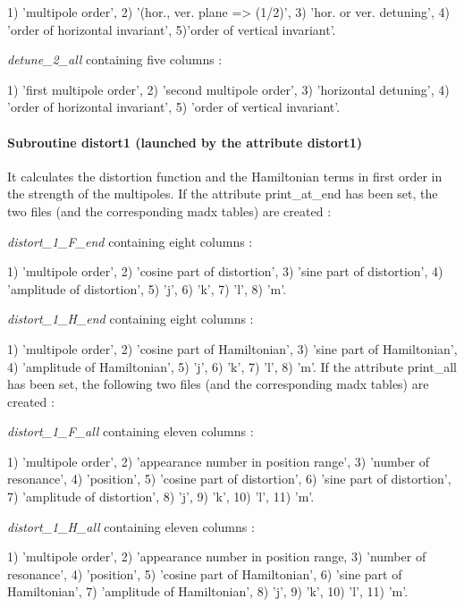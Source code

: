  1) 'multipole order', 2) '(hor., ver. plane => (1/2)',  3) 'hor. or ver. detuning', 4) 'order of horizontal invariant', 5)'order of vertical invariant'. 
 
\textit{detune\_2\_all}  containing five columns :  

 1) 'first multipole order', 2) 'second multipole order',  3) 'horizontal detuning', 4) 'order of horizontal invariant', 5) 'order of vertical invariant'. 




\paragraph{Subroutine distort1 (launched by the attribute distort1)}  It calculates the distortion function and the Hamiltonian terms in first order in the strength of the multipoles. If the attribute print\_at\_end has been set, the two files  (and the corresponding madx tables) are created : 

\textit{distort\_1\_F\_end} containing eight columns : 

 1) 'multipole order', 2) 'cosine part of distortion', 3) 'sine part of distortion', 4) 'amplitude of distortion', 5) 'j', 6) 'k', 7) 'l', 8) 'm'. 

\textit{distort\_1\_H\_end}  containing eight columns : 

 1) 'multipole order', 2) 'cosine part of Hamiltonian', 3) 'sine part of Hamiltonian', 4) 'amplitude of Hamiltonian', 5) 'j', 6) 'k', 7) 'l', 8) 'm'.  
 If the attribute print\_all has been set, the following two files  (and the corresponding madx tables) are created : 

\textit{distort\_1\_F\_all} containing eleven columns :  

 1) 'multipole order', 2) 'appearance number in position range', 3) 'number of resonance', 4) 'position', 5) 'cosine part of distortion', 6) 'sine part of distortion', 7) 'amplitude of distortion', 8) 'j', 9) 'k', 10) 'l', 11) 'm'. 

\textit{distort\_1\_H\_all}  containing eleven columns : 

 1) 'multipole order', 2) 'appearance number in position range, 3) 'number of resonance', 4) 'position', 5) 'cosine part of Hamiltonian', 6) 'sine part of Hamiltonian', 7) 'amplitude of Hamiltonian', 8) 'j', 9) 'k', 10) 'l', 11) 'm'.  



